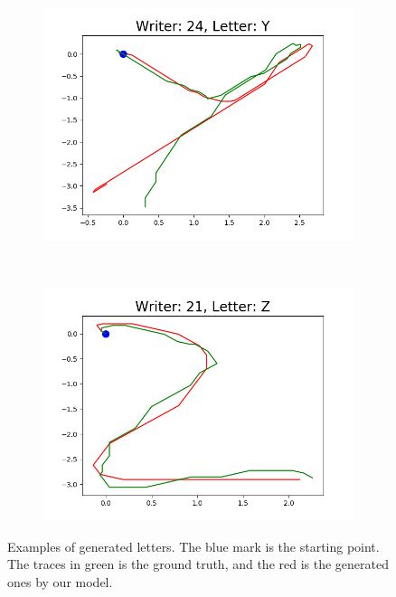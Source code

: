 \begin{figure}
\begin{subfigure}[b]{0.17\textwidth}
          \includegraphics[width=\textwidth]{images/framework/comparison_figures/Y_24.png}
      \end{subfigure}
      ~
      \begin{subfigure}[b]{0.17\textwidth}
          \includegraphics[width=\textwidth]{images/framework/comparison_figures/Z_21.png}
      \end{subfigure}

      \caption{Examples of generated letters. The blue mark is the starting point. The traces in green is the ground truth, and the red is the generated ones by our model.}
      \label{fig:letters_examples}
  \end{figure}


